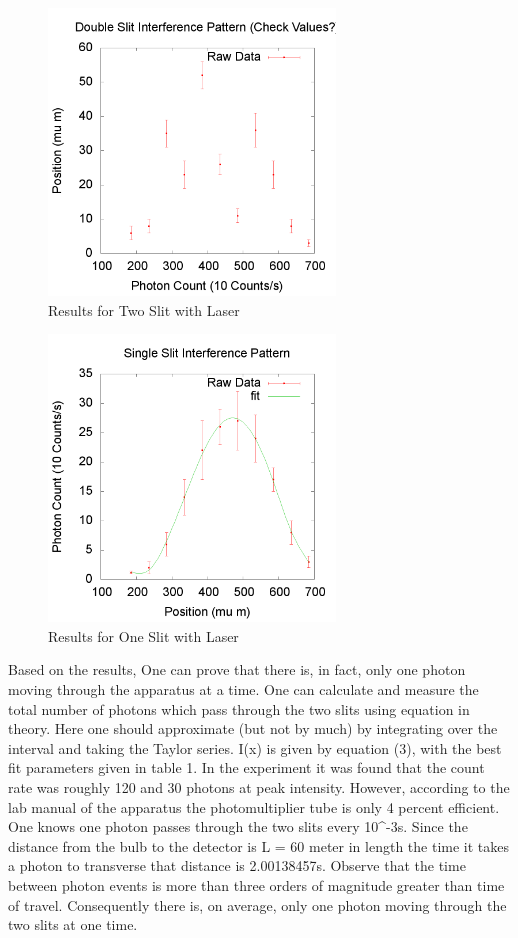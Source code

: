 \documentclass[12pt,twocolumn]{article}
\begin{document}
\begin{figure}[h!]
	\centering
	\label{fig:2slit}
	\includegraphics[width=3in]{images/Twoslit}
	\caption{Results for Two Slit with Laser}
\end{figure}
\begin{figure}[h!]
	\centering
	\label{fig:1slit}
	\includegraphics[width=3in]{images/Oneslit}
	\caption{Results for One Slit with Laser}
\end{figure}
Based on the results, One can prove that there is, in fact, only one photon moving through the apparatus
at a time. One can calculate and measure the total number of photons which pass through the two slits using equation in theory.  Here one should approximate (but not by much) by integrating over the interval and taking the Taylor series. I(x) is given by equation (3), with the best fit parameters given in table 1. In the experiment it was found that the count rate was roughly 120 and 30 photons at peak intensity. However, according to the lab manual of the apparatus the photomultiplier tube is only 4 percent efficient. One knows one photon passes through the two slits every 10^-3s. Since the distance from the bulb to the detector is L = 60 meter in length the time it takes a photon to transverse that distance is 2.00138457s. Observe that the time between photon events is more than three orders of magnitude greater than time of travel. Consequently there is, on average, only one photon moving through the two slits at one time.
\end{document}
